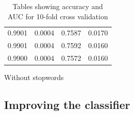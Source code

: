 \begin{table}
\begin{subtable}{.5\linewidth}
\begin{tabular}{cccc}
      0.9901          & 0.0004        & 0.7587          & 0.0170 \\
      0.9901          & 0.0004        & 0.7592          & 0.0160 \\
      0.9900          & 0.0004        & 0.7572          & 0.0160 \\ \bottomrule
    \end{tabular}
      \caption{Without stopwords}
      \label{tab:data_without_stopwords}
  \end{subtable}
\caption{Tables showing accuracy and AUC for 10-fold cross validation}
\label{tab:all_data_tables}
\end{table}



\subsection{Improving the classifier}
